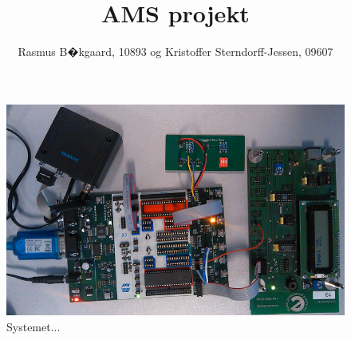 \documentclass[12pt,a4paper]{article}
\title{AMS projekt}
\author{Rasmus B�kgaard, 10893 og Kristoffer Sterndorff-Jessen, 09607}
\date{}
\begin{document}
\maketitle

\begin{figure}[hbtp]
\centering
\includegraphics[scale=0.8]{FrontPage}
\caption{Systemet...}
\end{figure}


\newpage

\tableofcontents

\newpage







\newpage

\end{document}
